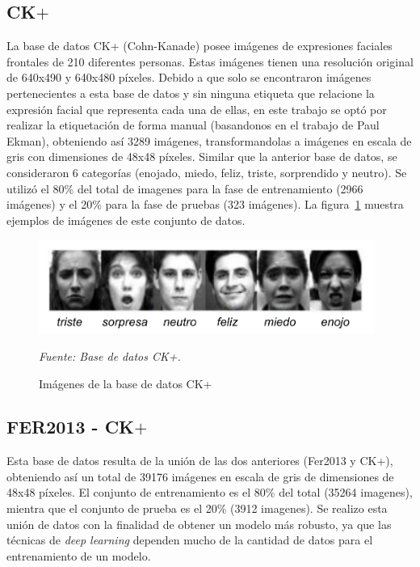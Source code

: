 \subsection{CK$+$}
\label{subsec:ck+}
La base de datos CK+ (Cohn-Kanade) posee imágenes de expresiones faciales frontales de 210 diferentes personas. Estas imágenes tienen una resolución original de 640x490 y 640x480 píxeles. Debido a que solo se encontraron imágenes pertenecientes a esta base de datos y sin ninguna etiqueta que relacione la expresión facial que representa cada una de ellas, en este trabajo se optó por realizar la etiquetación de forma manual (basandonos en el trabajo de Paul Ekman), obteniendo así 3289 imágenes, transformandolas a imágenes en escala de gris con dimensiones de 48x48 píxeles. Similar que la anterior base de datos, se consideraron 6 categorías (enojado, miedo, feliz, triste, sorprendido y neutro). Se utilizó el 80\% del total de imagenes para la fase de entrenamiento (2966 imágenes) y el 20\% para la fase de pruebas (323 imágenes). La figura~\ref{fig:imagenes_ck+} muestra ejemplos de imágenes de este conjunto de datos.

\begin{figure}[H]
		\centering
		\includegraphics[width=110mm]{Imagenes/imagenes_ck+.pdf}
		\caption{Imágenes de la base de datos CK+}
		\vspace{0.15cm}
		\textit{Fuente: Base de datos CK+.}
		\label{fig:imagenes_ck+}
\end{figure}


\subsection{FER2013 - CK$+$}
\label{subsec:ck+fer2013}
Esta base de datos resulta de la unión de las dos anteriores (Fer2013 y CK+), obteniendo así un total de 39176 imágenes en escala de gris de dimensiones de 48x48 píxeles. El conjunto de entrenamiento es el 80\% del total (35264 imagenes), mientra que el conjunto de prueba es el 20\% (3912 imagenes). Se realizo esta unión de datos con la finalidad de obtener un modelo más robusto, ya que las técnicas de \textit{deep learning} dependen mucho de la cantidad de datos para el entrenamiento de un modelo.

